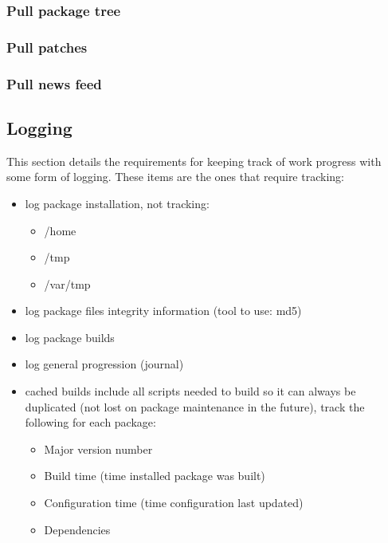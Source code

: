\subsubsection{Pull package tree}


\newpage
\subsubsection{Pull patches}


\newpage
\subsubsection{Pull news feed}




\newpage
\subsection{Logging}
This section details the requirements for keeping track of work progress
with some form of logging. These items are the ones that require tracking:

\begin{itemize}
  \item log package installation, not tracking:

  \begin{itemize}
    \item /home
    \item /tmp
		\item /var/tmp
  \end{itemize}

  \item log package files integrity information (tool to use: md5)
  \item log package builds
  \item log general progression (journal)
  \item cached builds include all scripts needed to build so it can always be duplicated (not lost on package maintenance in the future), track the following for each package:

\begin{itemize}
  \item Major version number
  \item Build time (time installed package was built)
  \item Configuration time (time configuration last updated)
  \item Dependencies 
\end{itemize}

\end{itemize}

